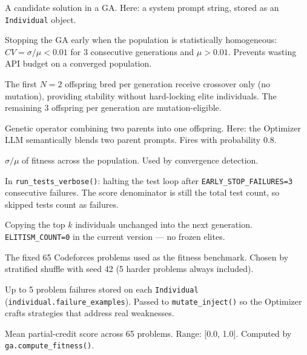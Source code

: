 \documentclass[11pt,a4paper]{report}
\newcommand{\fn}[1]{\texttt{#1}}
\begin{document}
\begin{description}[style=nextline, leftmargin=3cm, itemsep=2pt]

\item[Chromosome] A candidate solution in a GA.  Here: a system prompt string,
  stored as an \fn{Individual} object.

\item[Convergence detection] Stopping the GA early when the population is
  statistically homogeneous: $CV = \sigma/\mu < 0.01$ for 3 consecutive generations
  and $\mu > 0.01$.  Prevents wasting API budget on a converged population.

\item[CROSSOVER\_ONLY\_SLOTS] The first $N=2$ offspring bred per generation receive
  crossover only (no mutation), providing stability without hard-locking elite
  individuals.  The remaining 3 offspring per generation are mutation-eligible.

\item[Crossover] Genetic operator combining two parents into one offspring.  Here:
  the Optimizer LLM semantically blends two parent prompts.  Fires with probability 0.8.

\item[CV (coefficient of variation)] $\sigma / \mu$ of fitness across the population.
  Used by convergence detection.

\item[Early stopping (test loop)] In \fn{run\_tests\_verbose()}: halting the test loop
  after \fn{EARLY\_STOP\_FAILURES=3} consecutive failures.  The score denominator is
  still the total test count, so skipped tests count as failures.

\item[Elitism] Copying the top $k$ individuals unchanged into the next generation.
  \fn{ELITISM\_COUNT=0} in the current version --- no frozen elites.

\item[Evolution pool] The fixed 65 Codeforces problems used as the fitness benchmark.
  Chosen by stratified shuffle with seed 42 (5 harder problems always included).

\item[Failure examples] Up to 5 problem failures stored on each \fn{Individual}
  (\fn{individual.failure\_examples}).  Passed to \fn{mutate\_inject()} so the
  Optimizer crafts strategies that address real weaknesses.

\item[Fitness] Mean partial-credit score across 65 problems.  Range: [0.0, 1.0].
  Computed by \fn{ga.compute\_fitness()}.


\end{description}
\end{document}
